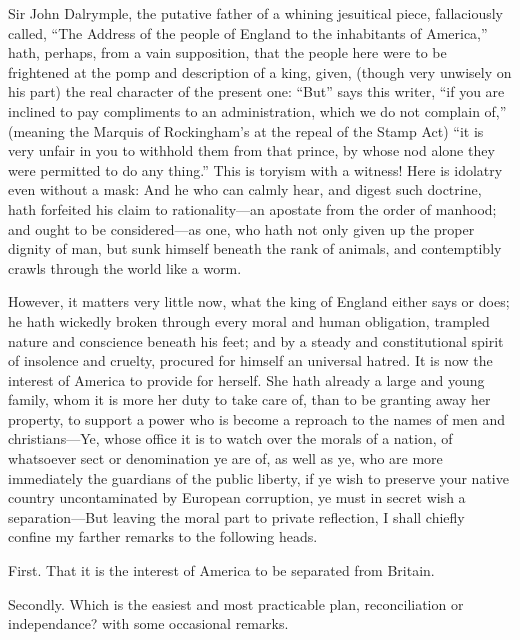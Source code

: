 \documentclass[12pt,oneside]{memoir}
\begin{document}
Sir John Dalrymple, the putative father of a whining jesuitical
piece, fallaciously called, ``The Address of the people of England to
the inhabitants of America,'' hath, perhaps, from a vain supposition,
that the people here were to be frightened at the pomp and
description of a king, given, (though very unwisely on his part) the
real character of the present one: ``But'' says this writer, ``if you
are inclined to pay compliments to an administration, which we do
not complain of,'' (meaning the Marquis of Rockingham's at the repeal
of the Stamp Act) ``it is very unfair in you to withhold them from
that prince, by whose nod alone they were permitted to do any
thing.'' This is toryism with a witness! Here is idolatry even
without a mask: And he who can calmly hear, and digest such doctrine,
hath forfeited his claim to rationality---an apostate from the order
of manhood; and ought to be considered---as one, who hath not only
given up the proper dignity of man, but sunk himself beneath the
rank of animals, and contemptibly crawls through the world like a
worm.

However, it matters very little now, what the king of England either
says or does; he hath wickedly broken through every moral and human
obligation, trampled nature and conscience beneath his feet; and by
a steady and constitutional spirit of insolence and cruelty,
procured for himself an universal hatred. It is now the interest of
America to provide for herself. She hath already a large and young
family, whom it is more her duty to take care of, than to be
granting away her property, to support a power who is become a
reproach to the names of men and christians---Ye, whose office it is
to watch over the morals of a nation, of whatsoever sect or
denomination ye are of, as well as ye, who are more immediately the
guardians of the public liberty, if ye wish to preserve your native
country uncontaminated by European corruption, ye must in secret
wish a separation---But leaving the moral part to private reflection,
I shall chiefly confine my farther remarks to the following heads.

First. That it is the interest of America to be separated from
Britain.

Secondly. Which is the easiest and most practicable plan,
reconciliation or independance? with some occasional remarks.
\end{document}
